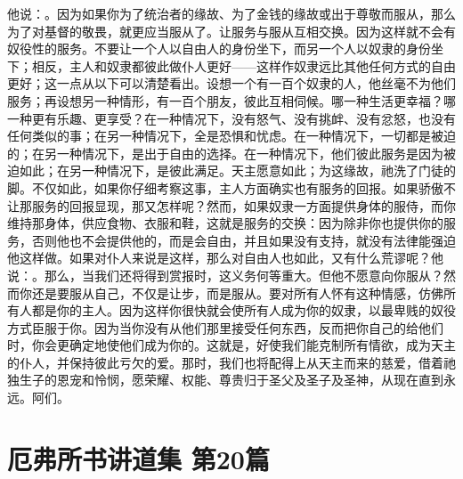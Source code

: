 他说：。因为如果你为了统治者的缘故、为了金钱的缘故或出于尊敬而服从，那么为了对基督的敬畏，就更应当服从了。让服务与服从互相交换。因为这样就不会有奴役性的服务。不要让一个人以自由人的身份坐下，而另一个人以奴隶的身份坐下；相反，主人和奴隶都彼此做仆人更好——这样作奴隶远比其他任何方式的自由更好；这一点从以下可以清楚看出。设想一个有一百个奴隶的人，他丝毫不为他们服务；再设想另一种情形，有一百个朋友，彼此互相伺候。哪一种生活更幸福？哪一种更有乐趣、更享受？在一种情况下，没有怒气、没有挑衅、没有忿怒，也没有任何类似的事；在另一种情况下，全是恐惧和忧虑。在一种情况下，一切都是被迫的；在另一种情况下，是出于自由的选择。在一种情况下，他们彼此服务是因为被迫如此；在另一种情况下，是彼此满足。天主愿意如此；为这缘故，祂洗了门徒的脚。不仅如此，如果你仔细考察这事，主人方面确实也有服务的回报。如果骄傲不让那服务的回报显现，那又怎样呢？然而，如果奴隶一方面提供身体的服侍，而你维持那身体，供应食物、衣服和鞋，这就是服务的交换：因为除非你也提供你的服务，否则他也不会提供他的，而是会自由，并且如果没有支持，就没有法律能强迫他这样做。如果对仆人来说是这样，那么对自由人也如此，又有什么荒谬呢？他说：。那么，当我们还将得到赏报时，这义务何等重大。但他不愿意向你服从？然而你还是要服从自己，不仅是让步，而是服从。要对所有人怀有这种情感，仿佛所有人都是你的主人。因为这样你很快就会使所有人成为你的奴隶，以最卑贱的奴役方式臣服于你。因为当你没有从他们那里接受任何东西，反而把你自己的给他们时，你会更确定地使他们成为你的。这就是，好使我们能克制所有情欲，成为天主的仆人，并保持彼此亏欠的爱。那时，我们也将配得上从天主而来的慈爱，借着祂独生子的恩宠和怜悯，愿荣耀、权能、尊贵归于圣父及圣子及圣神，从现在直到永远。阿们。\par



\section{厄弗所书讲道集 第20篇}

\par

\par

